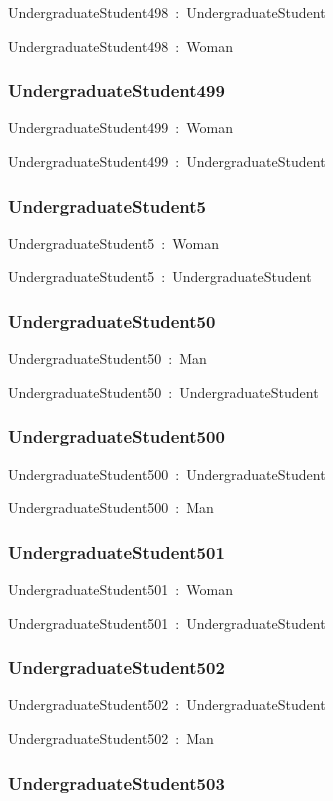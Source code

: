\documentclass{article}
\begin{document}
UndergraduateStudent498~:~UndergraduateStudent

UndergraduateStudent498~:~Woman

\subsubsection*{UndergraduateStudent499}

UndergraduateStudent499~:~Woman

UndergraduateStudent499~:~UndergraduateStudent

\subsubsection*{UndergraduateStudent5}

UndergraduateStudent5~:~Woman

UndergraduateStudent5~:~UndergraduateStudent

\subsubsection*{UndergraduateStudent50}

UndergraduateStudent50~:~Man

UndergraduateStudent50~:~UndergraduateStudent

\subsubsection*{UndergraduateStudent500}

UndergraduateStudent500~:~UndergraduateStudent

UndergraduateStudent500~:~Man

\subsubsection*{UndergraduateStudent501}

UndergraduateStudent501~:~Woman

UndergraduateStudent501~:~UndergraduateStudent

\subsubsection*{UndergraduateStudent502}

UndergraduateStudent502~:~UndergraduateStudent

UndergraduateStudent502~:~Man

\subsubsection*{UndergraduateStudent503}
\end{document}
